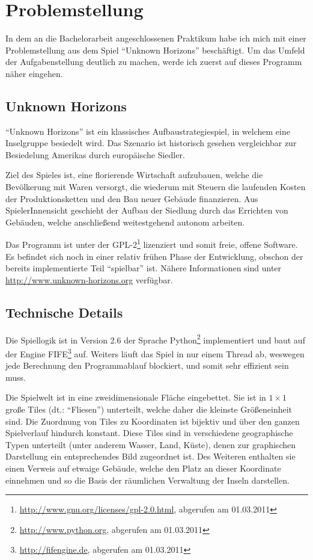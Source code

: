 \documentclass[%
			paper=a4,%
			DIV12,
			liststotoc,
			bibtotoc,
			draft=false,%
			titlepage,
			numbers=noendperiod
			]{scrartcl}
\newcommand{\footurl}[2]{\footnote{\url{#1}, abgerufen am #2}}
\begin{document}
\section{Problemstellung}

In dem an die Bachelorarbeit angeschlossenen Praktikum habe ich mich mit einer Problemstellung aus dem Spiel "`Unknown Horizons"' beschäftigt.
Um das Umfeld der Aufgabenstellung deutlich zu machen, werde ich zuerst auf dieses Programm näher eingehen.

\subsection{Unknown Horizons}
"`Unknown Horizons"' ist ein klassisches Aufbaustrategiespiel, in welchem eine Inselgruppe besiedelt wird. 
Das Szenario ist historisch gesehen vergleichbar zur Besiedelung Amerikas durch europäische Siedler.

Ziel des Spieles ist, eine florierende Wirtschaft aufzubauen, welche die Bevölkerung mit Waren versorgt, die wiederum mit Steuern die laufenden Kosten der Produktionsketten und den Bau neuer Gebäude finanzieren.
Aus SpielerInnensicht geschieht der Aufbau der Siedlung durch das Errichten von Gebäuden, welche anschließend weitestgehend autonom arbeiten.

Das Programm ist unter der GPL-2\footurl{http://www.gnu.org/licenses/gpl-2.0.html}{01.03.2011} lizenziert und somit freie, offene Software. 
Es befindet sich noch in einer relativ frühen Phase der Entwicklung, obschon der bereits implementierte Teil "`spielbar"' ist.
Nähere Informationen sind unter \url{http://www.unknown-horizons.org} verfügbar.

\subsection{Technische Details}

Die Spiellogik ist in Version 2.6 der Sprache Python\footurl{http://www.python.org}{01.03.2011} implementiert und
baut auf der Engine FIFE\footurl{http://fifengine.de}{01.03.2011} auf.
Weiters läuft das Spiel in nur einem Thread ab, weswegen jede Berechnung den Programmablauf blockiert, und somit sehr effizient sein muss.

Die Spielwelt ist in eine zweidimensionale Fläche eingebettet.
Sie ist in $1\times1$ große Tiles (dt.: "`Fliesen"') unterteilt, welche daher die kleinste Größeneinheit sind. 
Die Zuordnung von Tiles zu Koordinaten ist bijektiv und über den ganzen Spielverlauf hindurch konstant.
Diese Tiles sind in verschiedene geographische Typen unterteilt (unter anderem Wasser, Land, Küste), denen zur graphischen Darstellung ein entsprechendes Bild zugeordnet ist.
Des Weiteren enthalten sie einen Verweis auf etwaige Gebäude, welche den Platz an dieser Koordinate einnehmen und so die Basis der räumlichen Verwaltung der Inseln darstellen.
\end{document}
